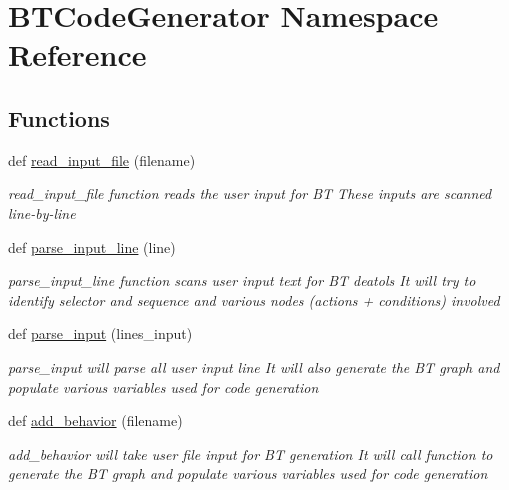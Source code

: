 \hypertarget{namespace_b_t_code_generator}{}\section{B\+T\+Code\+Generator Namespace Reference}
\label{namespace_b_t_code_generator}
\subsection*{Functions}
\begin{DoxyCompactItemize}
\item 
def \mbox{\hyperlink{namespace_b_t_code_generator_a548841053dca7d0b9bb401d8a71259aa}{read\+\_\+input\+\_\+file}} (filename)
\begin{DoxyCompactList}\small\item\em \textquotesingle{}read\+\_\+input\+\_\+file\textquotesingle{} function reads the user input for BT These inputs are scanned line-\/by-\/line \end{DoxyCompactList}\item 
def \mbox{\hyperlink{namespace_b_t_code_generator_ae52de22cf4520aa14434a2df5bba24e7}{parse\+\_\+input\+\_\+line}} (line)
\begin{DoxyCompactList}\small\item\em \textquotesingle{}parse\+\_\+input\+\_\+line\textquotesingle{} function scans user input text for BT deatols It will try to identify selector and sequence and various nodes (actions + conditions) involved \end{DoxyCompactList}\item 
def \mbox{\hyperlink{namespace_b_t_code_generator_afa9a33478ecf1013272426bffb04e651}{parse\+\_\+input}} (lines\+\_\+input)
\begin{DoxyCompactList}\small\item\em \textquotesingle{}parse\+\_\+input\textquotesingle{} will parse all user input line It will also generate the BT graph and populate various variables used for code generation \end{DoxyCompactList}\item 
def \mbox{\hyperlink{namespace_b_t_code_generator_af05eb4fb1b13c0354cdda3e602e1f3f7}{add\+\_\+behavior}} (filename)
\begin{DoxyCompactList}\small\item\em \textquotesingle{}add\+\_\+behavior\textquotesingle{} will take user file input for BT generation It will call function to generate the BT graph and populate various variables used for code generation \end{DoxyCompactList}\item 

\end{DoxyCompactItemize}
